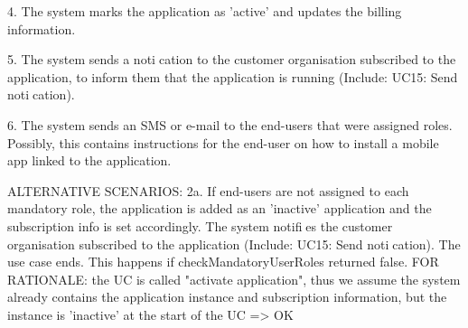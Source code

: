 {{{                %

            4. The system marks the application as 'active' and updates the billing information.

            5. The system sends a notication to the customer organisation subscribed to the application, to inform them that the application is running (Include: UC15: Send notication).

            6. The system sends an SMS or e-mail to the end-users that were assigned roles. Possibly, this contains instructions for the end-user on how to install a mobile app linked to the application.

            ALTERNATIVE SCENARIOS:
                2a. If end-users are not assigned to each mandatory role, the application is added as an 'inactive'
                application and the subscription info is set accordingly. The system notifies the customer
                organisation subscribed to the application (Include: UC15: Send notication). The use case ends.
                    This happens if checkMandatoryUserRoles returned false.
                    FOR RATIONALE: the UC is called "activate application", thus we assume the system already contains the
                                   application instance and subscription information, but the instance is 'inactive' at the start of the UC
                    => OK

}}}
